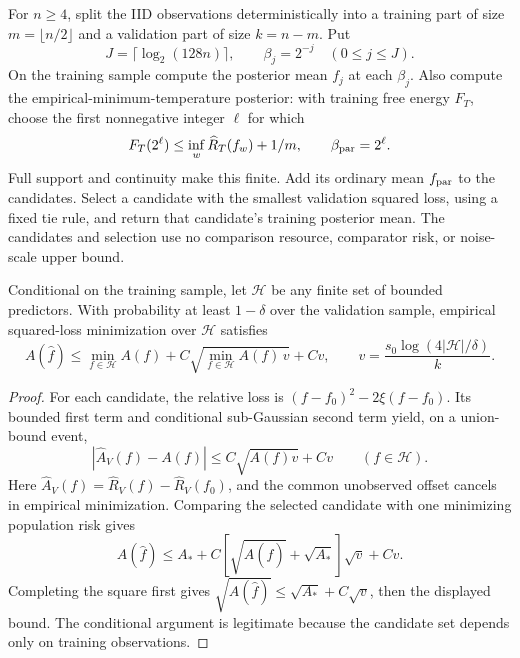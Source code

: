 For $n\ge4$, split the IID observations deterministically into a training part of size $m=\lfloor n/2\rfloor$ and a validation part of size $k=n-m$. Put
\[
 J=\lceil\log_2(128n)\rceil,
 \qquad \beta_j=2^{-j}\quad(0\le j\le J).
\]
On the training sample compute the posterior mean $f_j$ at each $\beta_j$. Also compute the empirical-minimum-temperature posterior: with training free energy $F_T$, choose the first nonnegative integer $\ell$ for which
\[
 F_T(2^\ell)\le\inf_w\widehat R_T(f_w)+1/m,
 \qquad\beta_{\rm par}=2^\ell.
\]
Full support and continuity make this finite. Add its ordinary mean $f_{\rm par}$ to the candidates. Select a candidate with the smallest validation squared loss, using a fixed tie rule, and return that candidate's training posterior mean. The candidates and selection use no comparison resource, comparator risk, or noise-scale upper bound.

\begin{lemma}
\label{lem:validation-relative-oracle}
Conditional on the training sample, let $\mathcal H$ be any finite set of bounded predictors. With probability at least $1-\delta$ over the validation sample, empirical squared-loss minimization over $\mathcal H$ satisfies
\[
 A(\widehat f)\le\min_{f\in\mathcal H}A(f)
   +C\sqrt{\min_{f\in\mathcal H}A(f)\,v}+Cv,
 \qquad v=\frac{s_0\log(4|\mathcal H|/\delta)}k.
\]
\end{lemma}
\begin{proof}
For each candidate, the relative loss is
$(f-f_0)^2-2\xi(f-f_0)$. Its bounded first term and conditional sub-Gaussian second term yield, on a union-bound event,
\[
 |\widehat A_V(f)-A(f)|\le C\sqrt{A(f)v}+Cv
 \qquad(f\in\mathcal H).
\]
Here $\widehat A_V(f)=\widehat R_V(f)-\widehat R_V(f_0)$, and the common unobserved offset cancels in empirical minimization. Comparing the selected candidate with one minimizing population risk gives
\[
 A(\widehat f)\le A_*+
       C[\sqrt{A(\widehat f)}+\sqrt{A_*}]\sqrt v+Cv.
\]
Completing the square first gives
$\sqrt{A(\widehat f)}\le\sqrt{A_*}+C\sqrt v$, then the displayed bound. The conditional argument is legitimate because the candidate set depends only on training observations.
\end{proof}

